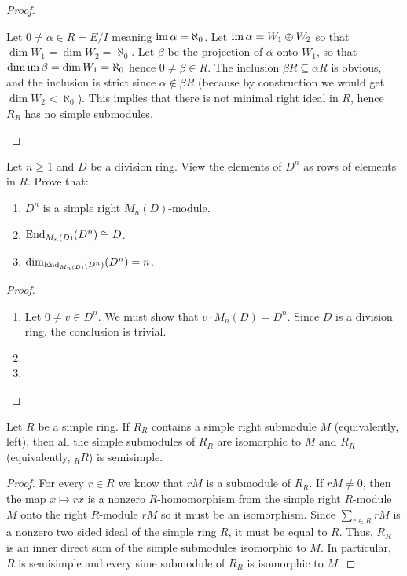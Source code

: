 \documentclass[11pt,a4paper]{article}
\begin{document}
\begin{proof}
\begin{enumerate}
      Let $0 \neq \alpha \in R = E/I$ meaning $\operatorname{im} \alpha = \aleph_0$.
      Let $\operatorname{im} \alpha = W_1 \oplus W_2$
      so that $\dim W_1 = \dim W_2 = \aleph_0$.
      Let $\beta$ be the projection of $\alpha$ onto $W_1$,
      so that $\dim \operatorname{im} \beta = \dim W_1 = \aleph_0$ hence $0 \neq \beta \in R$.
      The inclusion $\beta R \subseteq \alpha R$ is obvious,
      and the inclusion is strict since $\alpha \notin \beta R$
      (because by construction we would get $\dim W_2 < \aleph_0$).
      This implies that there is not minimal right ideal in $R$,
      hence $R_R$ has no simple submodules.
  \end{enumerate}
\end{proof}

\begin{exercise}
  Let $n \geq 1$ and $D$ be a division ring.
  View the elements of $D^n$ as rows of elements in $R$.
  Prove that:
  \begin{enumerate}
    \item[(1)] $D^n$ is a simple right $M_n(D)$-module.
    \item[(2)] $\operatorname{End}_{M_n(D)}(D^n) \cong D$.
    \item[(3)] $\dim_{\operatorname{End}_{M_n(D)}(D^n)}(D^n) = n$.
  \end{enumerate}
\end{exercise}
\begin{proof} \phantom{}
  \begin{enumerate}
    \item[(1)] Let $0 \neq v \in D^n$.
      We must show that $v \cdot M_n(D) = D^n$.
      Since $D$ is a division ring, the conclusion is trivial.
    \item[(2)] 
    \item[(3)] 
  \end{enumerate}
\end{proof}

\begin{lemma}
  \label{lemma:submodules-of-rR-for-simple-R}
  Let $R$ be a simple ring.
  If $R_R$ contains a simple right submodule $M$ (equivalently, left),
  then all the simple submodules of $R_R$ are isomorphic to $M$ and $R_R$
  (equivalently, $_R R$) is semisimple.
\end{lemma}
\begin{proof}
  For every $r \in R$ we know that $rM$ is a submodule of $R_R$.
  If $rM \neq 0$, then the map $x \mapsto rx$ is a nonzero $R$-homomorphism
  from the simple right $R$-module $M$ onto the right $R$-module $rM$
  so it must be an isomorphism.
  Since $\sum_{r \in R} rM$ is a nonzero two sided ideal of the simple ring $R$,
  it must be equal to $R$.
  Thus, $R_R$ is an inner direct sum of the simple submodules isomorphic to $M$.
  In particular, $R$ is semisimple and every sime submodule of $R_R$ is
  isomorphic to $M$.
\end{proof}
\end{document}
